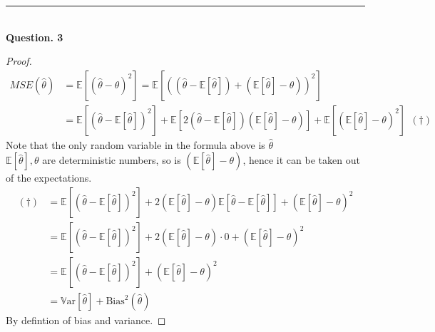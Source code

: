 \documentclass[a4paper, 10pt]{article}
\theoremstyle{definition}
\theoremstyle{hSol}
\begin{document}
\noindent\rule{16cm}{0.4pt}
~\\
\textbf{Question. 3}
\begin{proof}
\begin{equation}
  \begin{split}
    MSE(\hat{\theta}) &= \mathbb{E}\left[(\hat{\theta} - \theta)^2\right] = \mathbb{E}\left[\left((\hat{\theta} - \mathbb{E}[\hat{\theta}]) + (\mathbb{E}[\hat{\theta}]- \theta)\right)^2\right] \\
    &= \mathbb{E}\left[(\hat{\theta} - \mathbb{E}[\hat{\theta}])^2\right] + \mathbb{E}\left[2(\hat{\theta} - \mathbb{E}[\hat{\theta}])(\mathbb{E}[\hat{\theta}]- \theta)\right] + \mathbb{E}\left[(\mathbb{E}[\hat{\theta}]- \theta)^2\right]~~(\dag)
  \end{split}
\end{equation}
Note that the only random variable in the formula above is $\hat{\theta}$\\
$\mathbb{E}[\hat{\theta}], \theta$ are deterministic numbers, so is $(\mathbb{E}[\hat{\theta}]- \theta)$, hence it can be taken out of the expectations.
\begin{equation}
  \begin{split}
    (\dag) & = \mathbb{E}\left[(\hat{\theta} - \mathbb{E}[\hat{\theta}])^2\right] + 2(\mathbb{E}[\hat{\theta}]- \theta)\mathbb{E}\left[\hat{\theta} - \mathbb{E}[\hat{\theta}]\right] + (\mathbb{E}[\hat{\theta}]- \theta)^2\\
     &= \mathbb{E}\left[(\hat{\theta} - \mathbb{E}[\hat{\theta}])^2\right] + 2(\mathbb{E}[\hat{\theta}]- \theta)\cdot 0+ (\mathbb{E}[\hat{\theta}]- \theta)^2\\
     &=  \mathbb{E}\left[(\hat{\theta} - \mathbb{E}[\hat{\theta}])^2\right]  + (\mathbb{E}[\hat{\theta}]- \theta)^2 \\
     &= \mathrm{\mathbb{V}ar}[\hat{\theta}] + \text{Bias}^2(\hat{\theta})
  \end{split}
\end{equation}
By defintion of bias and variance.
\end{proof}
\end{document}
